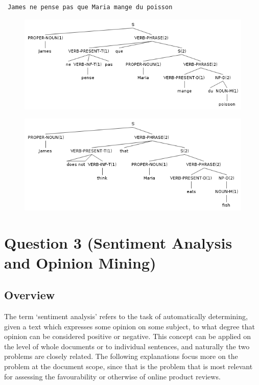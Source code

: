 \documentclass[11pt]{article}
\begin{document}
\begin{verbatim} James ne pense pas que Maria mange du poisson \end{verbatim}
\begin{figure}[H]
\includegraphics[scale=0.7]{james-ne-pense-pas-que-maria-mange-du-poisson.png}
\end{figure}
\begin{figure}[H]
\includegraphics[scale=0.7]{james-does-not-think-that-maria-eats-fish.png}
\end{figure}

\section*{Question 3 (Sentiment Analysis and Opinion Mining)}
\subsection*{Overview}
The term `sentiment analysis' refers to the task of automatically determining,
given a text which expresses some opinion on some subject, to what degree that
opinion can be considered positive or negative. This concept can be applied on
the level of whole documents or to individual sentences, and naturally the two
problems are closely related. The following explanations focus more on the
problem at the document scope, since that is the problem that is most relevant
for assessing the favourability or otherwise of online product reviews.
\end{document}
